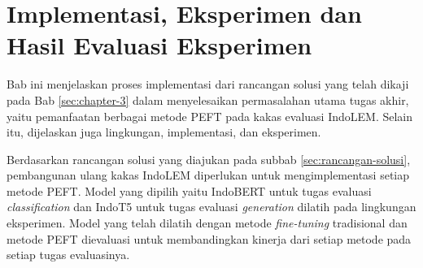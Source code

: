 \chapter{Implementasi, Eksperimen dan Hasil Evaluasi Eksperimen}
Bab ini menjelaskan proses implementasi dari rancangan solusi yang telah dikaji pada Bab \ref{sec:chapter-3} dalam menyelesaikan permasalahan utama tugas akhir, yaitu pemanfaatan berbagai metode PEFT pada kakas evaluasi IndoLEM. Selain itu, dijelaskan juga lingkungan, implementasi, dan eksperimen.

Berdasarkan rancangan solusi yang diajukan pada subbab \ref{sec:rancangan-solusi}, pembangunan ulang kakas IndoLEM diperlukan untuk mengimplementasi setiap metode PEFT. Model yang dipilih yaitu IndoBERT untuk tugas evaluasi \textit{classification} dan IndoT5 untuk tugas evaluasi \textit{generation} dilatih pada lingkungan eksperimen. Model yang telah dilatih dengan metode \textit{fine-tuning} tradisional dan metode PEFT dievaluasi untuk membandingkan kinerja dari setiap metode pada setiap tugas evaluasinya.








